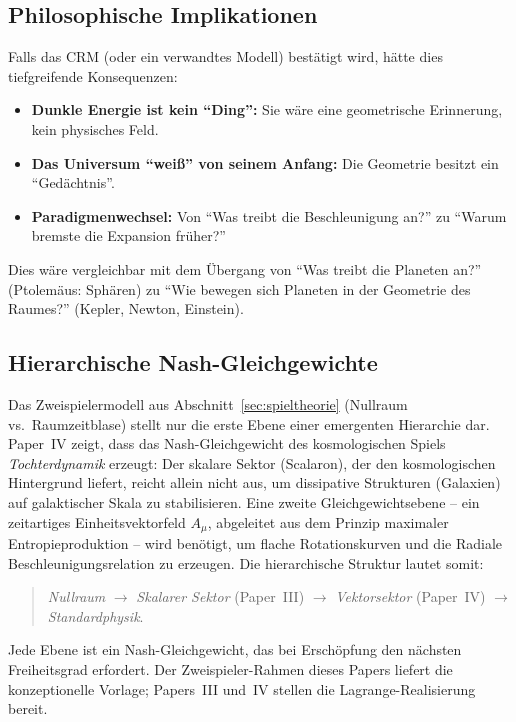\documentclass[aps,prd,twocolumn,superscriptaddress,nofootinbib]{revtex4-2}
\begin{document}
\subsection{Philosophische Implikationen}

Falls das CRM (oder ein verwandtes Modell) best\"atigt wird, h\"atte dies tiefgreifende Konsequenzen:

\begin{itemize}
\item \textbf{Dunkle Energie ist kein ``Ding'':} Sie w\"are eine geometrische Erinnerung, kein physisches Feld.
\item \textbf{Das Universum ``wei\ss{}'' von seinem Anfang:} Die Geometrie besitzt ein ``Ged\"achtnis''.
\item \textbf{Paradigmenwechsel:} Von ``Was treibt die Beschleunigung an?'' zu ``Warum bremste die Expansion fr\"uher?''
\end{itemize}

Dies w\"are vergleichbar mit dem \"Ubergang von ``Was treibt die Planeten an?'' (Ptolem\"aus: Sph\"aren) zu ``Wie bewegen sich Planeten in der Geometrie des Raumes?'' (Kepler, Newton, Einstein).

\subsection{Hierarchische Nash-Gleichgewichte}
\label{subsec:hierarchische_nash}

Das Zweispielermodell aus Abschnitt~\ref{sec:spieltheorie} (Nullraum vs.\ Raumzeitblase) stellt nur die erste Ebene einer emergenten Hierarchie dar. Paper~IV \cite{Geiger2026d} zeigt, dass das Nash-Gleichgewicht des kosmologischen Spiels \emph{Tochterdynamik} erzeugt: Der skalare Sektor (Scalaron), der den kosmologischen Hintergrund liefert, reicht allein nicht aus, um dissipative Strukturen (Galaxien) auf galaktischer Skala zu stabilisieren. Eine zweite Gleichgewichtsebene -- ein zeitartiges Einheitsvektorfeld $A_\mu$, abgeleitet aus dem Prinzip maximaler Entropieproduktion -- wird ben\"otigt, um flache Rotationskurven und die Radiale Beschleunigungsrelation zu erzeugen. Die hierarchische Struktur lautet somit:
\begin{quote}
\textit{Nullraum} $\to$ \textit{Skalarer Sektor} (Paper~III) $\to$ \textit{Vektorsektor} (Paper~IV) $\to$ \textit{Standardphysik}.
\end{quote}
Jede Ebene ist ein Nash-Gleichgewicht, das bei Ersch\"opfung den n\"achsten Freiheitsgrad erfordert. Der Zweispieler-Rahmen dieses Papers liefert die konzeptionelle Vorlage; Papers~III und~IV stellen die Lagrange-Realisierung bereit.
\end{document}

